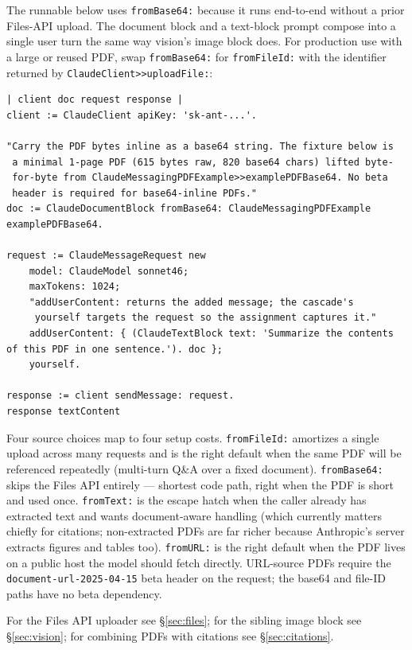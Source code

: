 \documentclass[a4paper,10pt,fleqn]{article}
\begin{document}
The runnable below uses \texttt{fromBase64:} because it runs
end-to-end without a prior Files-API upload.  The document block
and a text-block prompt compose into a single user turn the same
way vision's image block does.  For production use with a large or
reused PDF, swap \texttt{fromBase64:} for \texttt{fromFileId:} with
the identifier returned by \texttt{ClaudeClient>>uploadFile:}:

\begin{lstlisting}[language={}]
| client doc request response |
client := ClaudeClient apiKey: 'sk-ant-...'.

"Carry the PDF bytes inline as a base64 string. The fixture below is
 a minimal 1-page PDF (615 bytes raw, 820 base64 chars) lifted byte-
 for-byte from ClaudeMessagingPDFExample>>examplePDFBase64. No beta
 header is required for base64-inline PDFs."
doc := ClaudeDocumentBlock fromBase64: ClaudeMessagingPDFExample examplePDFBase64.

request := ClaudeMessageRequest new
    model: ClaudeModel sonnet46;
    maxTokens: 1024;
    "addUserContent: returns the added message; the cascade's
     yourself targets the request so the assignment captures it."
    addUserContent: { (ClaudeTextBlock text: 'Summarize the contents of this PDF in one sentence.'). doc };
    yourself.

response := client sendMessage: request.
response textContent
\end{lstlisting}

Four source choices map to four setup costs.  \texttt{fromFileId:}
amortizes a single upload across many requests and is the right
default when the same PDF will be referenced repeatedly (multi-turn
Q\&A over a fixed document).  \texttt{fromBase64:} skips the Files
API entirely --- shortest code path, right when the PDF is short
and used once.  \texttt{fromText:} is the escape hatch when the
caller already has extracted text and wants document-aware
handling (which currently matters chiefly for citations;
non-extracted PDFs are far richer because Anthropic's server
extracts figures and tables too).  \texttt{fromURL:} is the
right default when the PDF lives on a public host the model
should fetch directly.  URL-source PDFs require the
\texttt{document-url-2025-04-15} beta header on the request; the
base64 and file-ID paths have no beta dependency.

For the Files API uploader see \S\ref{sec:files}; for the sibling
image block see \S\ref{sec:vision}; for combining PDFs with
citations see \S\ref{sec:citations}.
\end{document}
